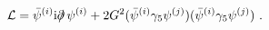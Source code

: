 \begin{equation}
{\cal L} = \bar{\psi}^{(i)} {\rm i} \partial \!\!\!/ \,\psi^{(i)} +
2 G^2 (\bar{\psi}^{(i)} \gamma_5 \psi^{(j)})  (\bar{\psi}^{(i)} \gamma_5 \psi^{(j)}) \ .
\label{eq1p}
\end{equation}

